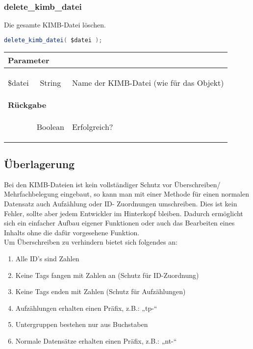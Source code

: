 \documentclass[paper=A4,pagesize=auto,12pt,headinclude=true,footinclude=true,BCOR=0mm,DIV=calc]{scrartcl}
\begin{document}
  \subsubsection{delete\_kimb\_datei}
	    Die gesamte KIMB-Datei löschen.
	    \begin{lstlisting}[gobble=4,language=Java]
	      delete_kimb_datei( $datei );
	    \end{lstlisting}
	    
	     \begin{tabular}{|lcp{}|}
		    \hline
		      \multicolumn{3}{|l|}{ \textbf{Parameter} } \\
		    \hline
		         \$datei & String & \begin{itshape} Name der KIMB-Datei (wie für das Objekt)\end{itshape} \\
		    \hline
		      \multicolumn{3}{|l|}{ \textbf{Rückgabe} } \\
		    \hline
			     & Boolean & \begin{itshape} Erfolgreich? \end{itshape} \\
		    \hline
	    \end{tabular}
 
  \newpage
  
  \subsection{Überlagerung}
  
  Bei den KIMB-Dateien ist kein vollständiger Schutz vor Überschreiben/ Mehrfachbelegung eingebaut, 
  so kann man mit einer Methode für einen normalen Datensatz auch Aufzählung oder ID-
  Zuordnungen umschreiben. Dies ist kein Fehler, sollte aber jedem Entwickler im 
  Hinterkopf bleiben. Dadurch ermöglicht sich ein einfacher Aufbau eigener Funktionen 
  oder auch das Bearbeiten eines Inhalts ohne die dafür vorgesehene Funktion.\\
  Um Überschreiben zu verhindern bietet sich folgendes an:
  
  \begin{enumerate}
   \item Alle ID's sind Zahlen
   \item Keine Tags fangen mit Zahlen an (Schutz für ID-Zuordnung)
   \item Keine Tags enden mit Zahlen (Schutz für Aufzählungen)
   \item Aufzählungen erhalten einen Präfix, z.B.: „tp-“
   \item Untergruppen bestehen nur aus Buchstaben
   \item Normale Datensätze erhalten einen Präfix, z.B.: „nt-“
  \end{enumerate}
  
\end{document}
